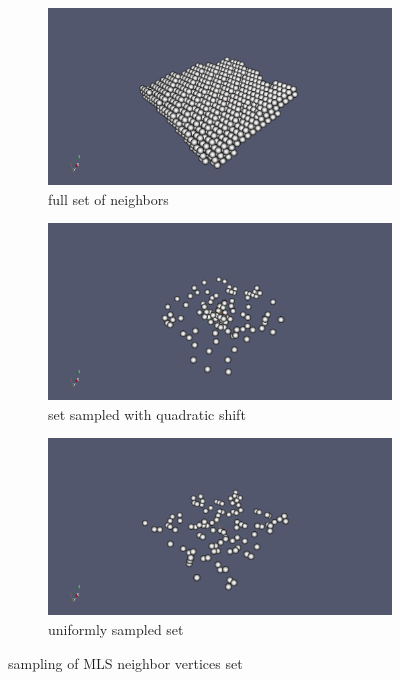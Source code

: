 \begin{figure}
	\begin{center}
		\begin{subfigure}[b]{0.9\textwidth}
			\includegraphics[width=\textwidth]{figures/SamplingFullDomain.png}
			\caption{full set of neighbors}
		\end{subfigure}
		\begin{subfigure}[b]{0.9\textwidth}
			\includegraphics[width=\textwidth]{figures/SamplingQuadratic.png}
			\caption{set sampled with quadratic shift}
		\end{subfigure}
		\begin{subfigure}[b]{0.9\textwidth}
			\includegraphics[width=\textwidth]{figures/SamplingUniform.png}
			\caption{uniformly sampled set}
		\end{subfigure}
	\end{center}
	\caption{sampling of MLS neighbor vertices set} \label{fig:cluster_sampled}
\end{figure}
